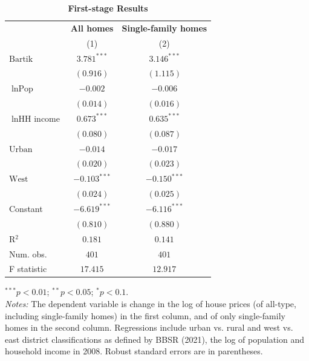 \documentclass[
  12pt,
]{article}
\begin{document}
\begin{table}[H] \caption{\textbf{First-stage Results}} \begin{center} \begin{footnotesize} \begin{threeparttable} \begin{tabular}{l c c} \toprule  & \multicolumn{1}{c}{\textbf{All homes}} & \multicolumn{1}{c}{\textbf{Single-family homes}} \\ \cmidrule(lr){2-2} \cmidrule(lr){3-3}  & (1) & (2) \\ \midrule $\text{Bartik}$         & $3.781^{***}$  & $3.146^{***}$  \\                         & $(0.916)$      & $(1.115)$      \\ $\ln{\text{Pop}}$       & $-0.002$       & $-0.006$       \\                         & $(0.014)$      & $(0.016)$      \\ $\ln{\text{HH income}}$ & $0.673^{***}$  & $0.635^{***}$  \\                         & $(0.080)$      & $(0.087)$      \\ $\text{Urban}$          & $-0.014$       & $-0.017$       \\                         & $(0.020)$      & $(0.023)$      \\ $\text{West}$           & $-0.103^{***}$ & $-0.150^{***}$ \\                         & $(0.024)$      & $(0.025)$      \\ Constant                & $-6.619^{***}$ & $-6.116^{***}$ \\                         & $(0.810)$      & $(0.880)$      \\ \midrule R$^2$                   & $0.181$        & $0.141$        \\ Num. obs.               & $401$          & $401$          \\ F statistic             & $17.415$       & $12.917$       \\ \bottomrule \end{tabular} \begin{tablenotes}[flushleft] \tiny{\item $^{***}p<0.01$; $^{**}p<0.05$; $^{*}p<0.1$. \\ \textit{Notes:} The dependent variable is change in the log of house prices (of all-type, including single-family homes) in the first column, and of only single-family homes in the second column. Regressions include urban vs. rural and west vs. east district classifications as defined by BBSR (2021), the log of population and household income in 2008. Robust standard errors are in parentheses.} \end{tablenotes} \end{threeparttable} \end{footnotesize} \label{tab:first-stage-results-checked} \end{center} \end{table}
\end{document}

